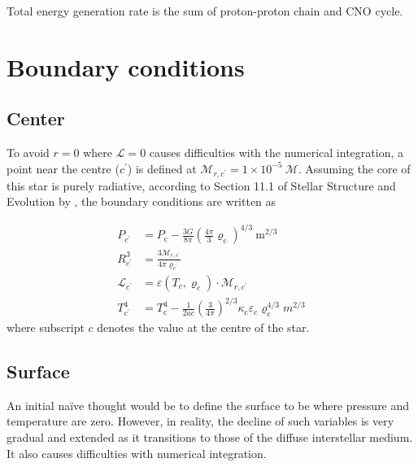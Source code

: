 \documentclass[twocolumn]{aastex631}
\begin{document}
Total energy generation rate is the sum of proton-proton chain and CNO cycle.

\section{Boundary conditions}
\label{sec:boundary_conditions}

\subsection{Center}
\label{sub:center}
To avoid $r=0$ where $\mathcal{L}=0$ causes difficulties with the numerical integration, a point near the centre ($c^\prime$) is defined at $\mathcal{M}_{r, {c^\prime}} = 1 \times 10^{-5} ~ \mathcal{M}$. Assuming the core of this star is purely radiative, according to Section 11.1 of Stellar Structure and Evolution by \cite{book:StellarStructureEvolution}, the boundary conditions are written as

\begin{align}
	P_{c^\prime}           & = P_{\mathrm{c}} -\frac{3 G}{8 \pi}\left(\frac{4 \pi}{3} \varrho_{\mathrm{c}}\right)^{4 / 3} \mathrm{~m}^{2 / 3}                                            \\
	R_{c^\prime}^3         & = \frac{3\mathcal{M}_{r, {c^\prime}}}{4 \pi \varrho_{c^\prime}}                                                                                             \\
	\mathcal{L}_{c^\prime} & = \varepsilon(T_c, \varrho_c) \cdot \mathcal{M}_{r, {c^\prime}}                                                                                             \\
	T_{c^\prime}^4         & = T_{\mathrm{c}}^4 - \frac{1}{2 a c}\left(\frac{3}{4 \pi}\right)^{2 / 3} \kappa_{\mathrm{c}}\varepsilon_{\mathrm{c}} \varrho_{\mathrm{c}}^{4 / 3} m^{2 / 3}
\end{align}
where subscript $c$ denotes the value at the centre of the star.

\subsection{Surface}
\label{sub:surface}
An initial naïve thought would be to define the surface to be where pressure and temperature are zero. However, in reality, the decline of such variables is very gradual and extended as it transitions to those of the diffuse interstellar medium. It also causes difficulties with numerical integration.
\end{document}
